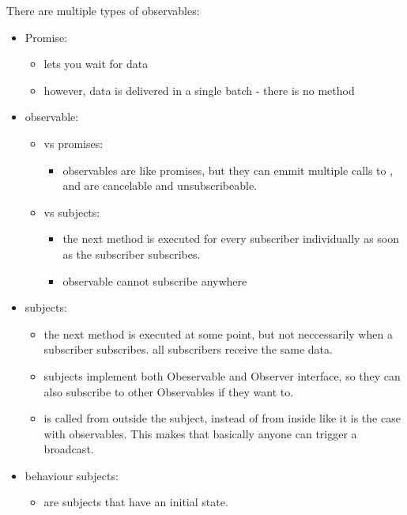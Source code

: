 There are multiple types of observables: 
\begin{itemize}
  \item Promise:
    \begin{itemize}
      \item lets you wait for data
      \item however, data is delivered in a single batch - there is no  method
    \end{itemize}
  \item observable: 
    \begin{itemize}
      \item vs promises:
        \begin{itemize}
          \item observables are like promises, but they can emmit multiple calls to , and are cancelable and unsubscribeable.
        \end{itemize}
      \item vs subjects:
        \begin{itemize}
          \item the next method is executed for every subscriber individually as soon as the subscriber subscribes. 
          \item observable cannot subscribe anywhere
        \end{itemize}
    \end{itemize}
  \item subjects:
    \begin{itemize}
      \item the next method is executed at some point, but not neccessarily when a subscriber subscribes. all subscribers receive the same data. 
      \item subjects implement both Obeservable and Observer interface, so they can also subscribe to other Observables if they want to. 
      \item {} is called from outside the subject, instead of from inside like it is the case with observables. This makes that basically anyone can trigger a broadcast. 
    \end{itemize}
  \item behaviour subjects:
    \begin{itemize}
      \item are subjects that have an initial state. 
    \end{itemize}
\end{itemize}

